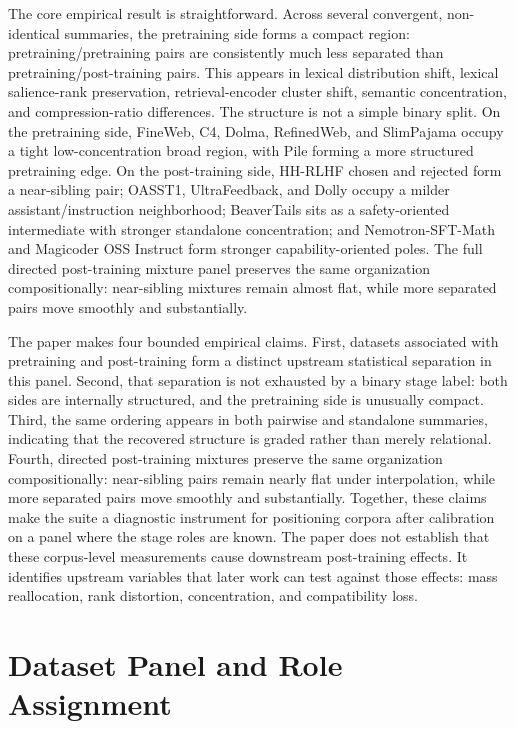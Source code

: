 \documentclass[11pt]{article}
\begin{document}
The core empirical result is straightforward. Across several convergent, non-identical summaries, the pretraining side forms a compact region: pretraining/pretraining pairs are consistently much less separated than pretraining/post-training pairs. This appears in lexical distribution shift, lexical salience-rank preservation, retrieval-encoder cluster shift, semantic concentration, and compression-ratio differences. The structure is not a simple binary split. On the pretraining side, FineWeb, C4, Dolma, RefinedWeb, and SlimPajama occupy a tight low-concentration broad region, with Pile forming a more structured pretraining edge. On the post-training side, HH-RLHF chosen and rejected form a near-sibling pair; OASST1, UltraFeedback, and Dolly occupy a milder assistant/instruction neighborhood; BeaverTails sits as a safety-oriented intermediate with stronger standalone concentration; and Nemotron-SFT-Math and Magicoder OSS Instruct form stronger capability-oriented poles. The full directed post-training mixture panel preserves the same organization compositionally: near-sibling mixtures remain almost flat, while more separated pairs move smoothly and substantially.

The paper makes four bounded empirical claims. First, datasets associated with pretraining and post-training form a distinct upstream statistical separation in this panel. Second, that separation is not exhausted by a binary stage label: both sides are internally structured, and the pretraining side is unusually compact. Third, the same ordering appears in both pairwise and standalone summaries, indicating that the recovered structure is graded rather than merely relational. Fourth, directed post-training mixtures preserve the same organization compositionally: near-sibling pairs remain nearly flat under interpolation, while more separated pairs move smoothly and substantially. Together, these claims make the suite a diagnostic instrument for positioning corpora after calibration on a panel where the stage roles are known. The paper does not establish that these corpus-level measurements cause downstream post-training effects. It identifies upstream variables that later work can test against those effects: mass reallocation, rank distortion, concentration, and compatibility loss.

\section{Dataset Panel and Role Assignment}\label{dataset-panel-and-role-assignment}
\end{document}
